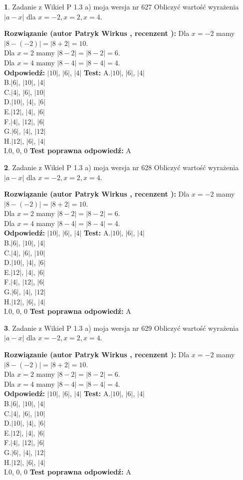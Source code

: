 \documentclass[12pt, a4paper]{article}
\theoremstyle{definition} %
\newtheorem{zad}{}
\newcommand{\zadStart}[1]{\begin{zad}#1\newline}
\newcommand{\zadStop}{\end{zad}}
\newcommand{\rozwStart}[2]{\noindent \textbf{Rozwiązanie (autor #1 , recenzent #2): }\newline}
\newcommand{\rozwStop}{\newline}
\newcommand{\odpStart}{\noindent \textbf{Odpowiedź:}\newline}
\newcommand{\odpStop}{\newline}
\newcommand{\testStart}{\noindent \textbf{Test:}\newline}
\newcommand{\testStop}{\newline}
\newcommand{\kluczStart}{\noindent \textbf{Test poprawna odpowiedź:}\newline}
\newcommand{\kluczStop}{\newline}
\begin{document}
\zadStart{Zadanie z Wikieł P 1.3 a) moja wersja nr 627}
Obliczyć wartość wyrażenia $|a - x|$ dla $x=-2,x=2,x=4$.
\zadStop
\rozwStart{Patryk Wirkus}{}
Dla $x = -2$ mamy $|8 - (-2)| = |8 + 2| = 10$.\\
Dla $x = 2$ mamy $|8 - 2| = |8 - 2| = 6$.\\
Dla $x = 4$ mamy $|8 - 4| = |8 - 4| = 4$.\\
\rozwStop
\odpStart
$|10|$, $|6|$, $|4|$
\odpStop
\testStart
A.$|10|$, $|6|$, $|4|$\\
B.$|6|$, $|10|$, $|4|$\\
C.$|4|$, $|6|$, $|10|$\\
D.$|10|$, $|4|$, $|6|$\\
E.$|12|$, $|4|$, $|6|$\\
F.$|4|$, $|12|$, $|6|$\\
G.$|6|$, $|4|$, $|12|$\\
H.$|12|$, $|6|$, $|4|$\\
I.$0$, $0$, $0$
\testStop
\kluczStart
A
\kluczStop



\zadStart{Zadanie z Wikieł P 1.3 a) moja wersja nr 628}
Obliczyć wartość wyrażenia $|a - x|$ dla $x=-2,x=2,x=4$.
\zadStop
\rozwStart{Patryk Wirkus}{}
Dla $x = -2$ mamy $|8 - (-2)| = |8 + 2| = 10$.\\
Dla $x = 2$ mamy $|8 - 2| = |8 - 2| = 6$.\\
Dla $x = 4$ mamy $|8 - 4| = |8 - 4| = 4$.\\
\rozwStop
\odpStart
$|10|$, $|6|$, $|4|$
\odpStop
\testStart
A.$|10|$, $|6|$, $|4|$\\
B.$|6|$, $|10|$, $|4|$\\
C.$|4|$, $|6|$, $|10|$\\
D.$|10|$, $|4|$, $|6|$\\
E.$|12|$, $|4|$, $|6|$\\
F.$|4|$, $|12|$, $|6|$\\
G.$|6|$, $|4|$, $|12|$\\
H.$|12|$, $|6|$, $|4|$\\
I.$0$, $0$, $0$
\testStop
\kluczStart
A
\kluczStop



\zadStart{Zadanie z Wikieł P 1.3 a) moja wersja nr 629}
Obliczyć wartość wyrażenia $|a - x|$ dla $x=-2,x=2,x=4$.
\zadStop
\rozwStart{Patryk Wirkus}{}
Dla $x = -2$ mamy $|8 - (-2)| = |8 + 2| = 10$.\\
Dla $x = 2$ mamy $|8 - 2| = |8 - 2| = 6$.\\
Dla $x = 4$ mamy $|8 - 4| = |8 - 4| = 4$.\\
\rozwStop
\odpStart
$|10|$, $|6|$, $|4|$
\odpStop
\testStart
A.$|10|$, $|6|$, $|4|$\\
B.$|6|$, $|10|$, $|4|$\\
C.$|4|$, $|6|$, $|10|$\\
D.$|10|$, $|4|$, $|6|$\\
E.$|12|$, $|4|$, $|6|$\\
F.$|4|$, $|12|$, $|6|$\\
G.$|6|$, $|4|$, $|12|$\\
H.$|12|$, $|6|$, $|4|$\\
I.$0$, $0$, $0$
\testStop
\kluczStart
A
\kluczStop
\end{document}
